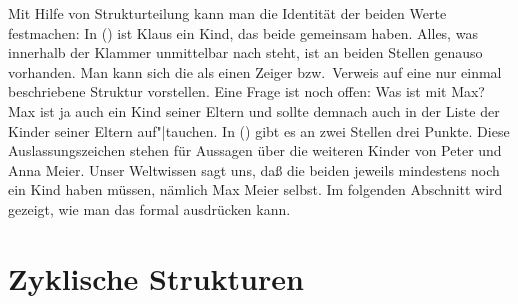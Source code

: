 Mit Hilfe von Strukturteilung kann man die Identität der beiden Werte
festmachen:
\ea
{}
\z
In () ist Klaus ein Kind, das beide gemeinsam haben. Alles, was innerhalb der Klammer unmittelbar
nach  steht, ist an beiden Stellen genauso vorhanden. Man kann sich die 
als einen Zeiger bzw.\ Verweis auf eine %
nur einmal beschriebene Struktur
vorstellen. Eine Frage ist noch offen: Was ist mit Max? Max ist ja auch ein
Kind seiner Eltern und sollte demnach auch in der Liste der Kinder seiner
Eltern auf"|tauchen. In () gibt es an zwei Stellen drei Punkte. Diese Auslassungszeichen stehen für Aussagen
über die weiteren Kinder von Peter und Anna Meier. Unser Weltwissen sagt uns, daß die beiden jeweils mindestens
noch ein Kind haben müssen, nämlich Max Meier selbst. Im folgenden Abschnitt wird gezeigt, wie
man das formal ausdrücken kann.%


\section{Zyklische Strukturen}


